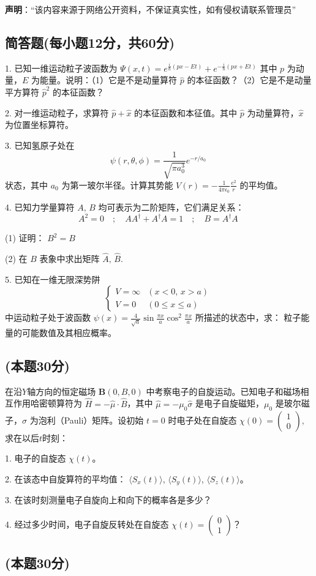 
\textbf{声明}：“该内容来源于网络公开资料，不保证真实性，如有侵权请联系管理员”

\subsection{简答题(每小题12分，共60分)}
1. 已知一维运动粒子波函数为
$ \Psi(x, t) = e^{\frac{i}{\hbar}(px - Et)} + e^{-\frac{i}{\hbar}(px + Et)}$ 
其中 $p$ 为动量，$E$ 为能量。说明：（1）它是不是动量算符 $\hat{p}$ 的本征函数？（2）它是不是动量平方算符 $\hat{p}^2$ 的本征函数？

2. 对一维运动粒子，求算符 $\hat{p} +\hat{x}$ 的本征函数和本征值。其中 $\hat{p}$ 为动量算符，$\hat{x}$ 为位置坐标算符。

3. 已知氢原子处在
$$ \psi(r, \theta, \phi) = \frac{1}{\sqrt{\pi a_0^3}} e^{-r/a_0}~$$ 
状态，其中 $a_0$ 为第一玻尔半径。计算其势能 $V(r) = -\frac{1}{4\pi \epsilon_0} \frac{e^2}{r}$ 的平均值。

4. 已知力学量算符 $A, \, B$ 均可表示为二阶矩阵，它们满足关系：
$$A^2 = 0 \quad ; \quad AA^{\dagger} + A^{\dagger}A = 1 \quad ; \quad B = A^{\dagger}A~$$

(1) 证明： $B^2 = B$

(2) 在 $B$ 表象中求出矩阵 $\hat{A}, \, \hat{B}$.

5. 已知在一维无限深势阱
$$
\begin{cases}
V = \infty & (x < 0, \, x > a) \\
V = 0 & (0 \leq x \leq a)
\end{cases}~
$$
中运动粒子处于波函数 $\psi(x) = \frac{4}{\sqrt{a}} \sin{\frac{\pi x}{a}} \cos^2{\frac{\pi x}{a}}$ 所描述的状态中，求：
粒子能量的可能数值及其相应概率。

\subsection{(本题30分)}
在沿$Y$轴方向的恒定磁场 $\mathbf{B}(0, B, 0)$ 中考察电子的自旋运动。已知电子和磁场相互作用哈密顿算符为 $\hat H = -\hat{\mu} \cdot \hat{B}$，其中 $\hat{\mu} = -\mu_{0} \hat{\sigma}$ 是电子自旋磁矩，$\mu_0$ 是玻尔磁子，$\hat{\sigma}$ 为泡利（Pauli）矩阵。设初始 $t=0$ 时电子处在自旋态
$ \chi(0) = \begin{pmatrix} 1 \\ 0 \end{pmatrix},$
求在以后$t$时刻：

1. 电子的自旋态 $\chi(t)$。

2. 在该态中自旋算符的平均值： $\langle S_x(t) \rangle$, $\langle S_y(t) \rangle$, $\langle S_z(t) \rangle$。

3. 在该时刻测量电子自旋向上和向下的概率各是多少？

4. 经过多少时间，电子自旋反转处在自旋态 $\chi(t) = \begin{pmatrix} 0 \\ 1 \end{pmatrix}$？

\subsection{(本题30分)}
